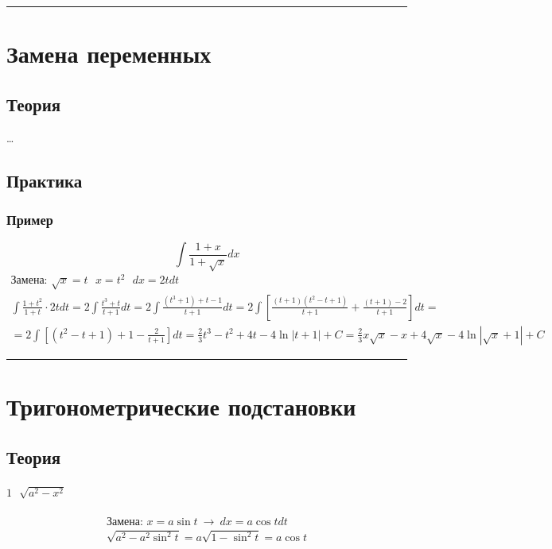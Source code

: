 \documentclass{article}
\begin{document}
\par\noindent\rule{\textwidth}{1pt}
\section{Замена переменных}

\subsection{Теория}
\dots


\subsection{Практика}

\subsubsection{Пример}
\[
    \int \frac{1 + x}{1 + \sqrt{x}} dx
\]
\begin{gather*}
    \text{Замена: } \sqrt{x} = t ~~~ x = t^2 ~~~ dx = 2tdt                                   \\
      \int \frac{1 + t^2}{1 + t} \cdot 2tdt =
      2\int \frac{t^3 + t}{t + 1} dt =
      2\int \frac{(t^3 + 1) + t - 1}{t + 1} dt =
      2\int \left[\frac{(t + 1)(t^2 - t + 1)}{t + 1} + \frac{(t + 1) - 2}{t + 1}\right] dt = \\
    = 2\int \left[(t^2 - t + 1) + 1 - \frac{2}{t + 1}\right] dt =
      \frac{2}{3} t^3 - t^2 + 4t - 4\ln |t + 1| + C =
      \frac{2}{3} x\sqrt{x} - x + 4\sqrt{x} - 4\ln |\sqrt{x} + 1 | + C
\end{gather*}



\par\noindent\rule{\textwidth}{1pt}
\section{Тригонометрические подстановки}

\subsection{Теория}
\paragraph{$\boxed{1} ~~~ \sqrt{a^2 - x^2}$}
\begin{gather*}
    \text{Замена: } x = a \sin t ~\rightarrow~ dx = a \cos t dt \\
    \sqrt{a^2 - a^2 \sin^2 t} = a \sqrt{1 - \sin^2 t} = a \cos t
\end{gather*}
\end{document}
